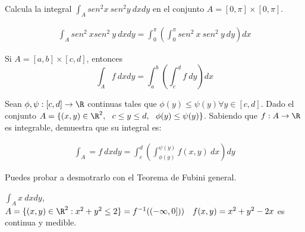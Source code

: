 \begin{ejer}
  Calcula la integral $\displaystyle \int_A sen^2x \ sen^2y \ dxdy$ en el conjunto
  $A = [0, \pi] \times [0, \pi]$.
\end{ejer}

\begin{sol}
  \begin{align*}
    \int_A sen^2 \ x sen^2 \ y \ dxdy = \int_{0}^{\pi}\left(\int_0^{\pi} sen^2 \
    x \ sen^2 \ y \ dy \right) dx
    \end{align*}
\end{sol}

\begin{nota}
  Si $A = [a, b] \times [c, d]$, entonces $$ \int_A f \ dxdy = \int_a^b \left(
    \int_c^d f \ dy \right) dx$$
\end{nota}

\begin{ejer}
  Sean $\phi, \psi : [c, d] \rightarrow \R$ continuas tales que $\phi(y) \leq
  \psi(y) \forall y \in [c, d]$. Dado el conjunto $A = \{ (x,y) \in \R^2, \ \ c
  \leq y \leq d, \ \ \phi(y) \leq \psi(y) \}$. Sabiendo que $f : A \rightarrow
  \R$ es integrable, demuestra que su integral es:

   \begin{align*}
    \int_A = f \ dxdy = \int_c^d \left( \int_{\phi(y)}^{\psi(y)} f(x,y) \ dx
    \right) dy
   \end{align*}

   Puedes probar a desmotrarlo con el Teorema de Fubini general.
 \end{ejer}

\begin{ejer}
    $\int_A x \ dxdy$, $A = \{ (x,y) \in \R^2 : x^2 + y^2 \leq 2 \} = f^{-1}((-\infty, 0])) \ \ \ f(x,y) = x^2+y^2-2x$ es continua y medible.
\end{ejer}

